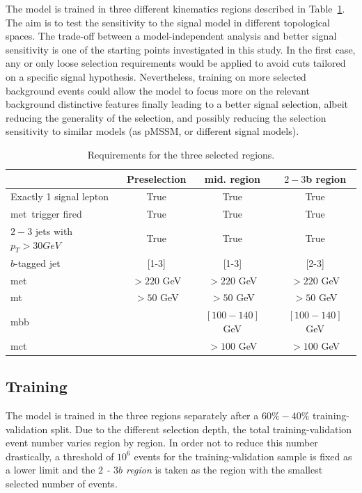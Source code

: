 The model is trained in three different kinematics regions described in Table~\ref{tab:all_regions_cuts}. The aim is to test the sensitivity to the signal model in different topological spaces. The trade-off between a model-independent analysis and better signal sensitivity is one of the starting points investigated in this study. In the first case, any or only loose selection requirements would be applied to avoid cuts tailored on a specific signal hypothesis. Nevertheless, training on more selected background events could allow the model to focus more on the relevant background distinctive features finally leading to a better signal selection, albeit reducing the generality of the selection, and possibly reducing the selection sensitivity to similar models (as pMSSM, or different signal models).

\begin{table}[h]
\centering
\caption{Requirements for the three selected regions.}
\label{tab:all_regions_cuts}
\begin{tabular}{lccc}
\hline
&Preselection &mid. region &$2-3$b region\\
\hline
Exactly 1 signal lepton&True&True&True\\
met\ trigger fired&True&True&True\\
$2-3$ jets with $p_{T}>30 GeV$&True&True&True\\
$b$-tagged jet&[1-3]&[1-3]&[2-3]\\
met\ &$> 220$ GeV&$> 220$ GeV&$> 220$ GeV\\
mt\ &$> 50$ GeV&$> 50$ GeV&$> 50$ GeV\\
mbb\ &&$[100-140]$ GeV&$[100-140]$ GeV\\
mct\ &&$>100$ GeV&$>100$ GeV\\
\hline
\end{tabular}
\end{table}

\subsection{Training}
\label{subsec:training}

The model is trained in the three regions separately after a $60\%-40\%$ training-validation split. Due to the different selection depth, the total training-validation event number varies region by region. In order not to reduce this number drastically, a threshold of $10^{6}$ events for the training-validation sample is fixed as a lower limit and the \textit{$2$ - $3b$ region} is taken as the region with the smallest selected number of events.


